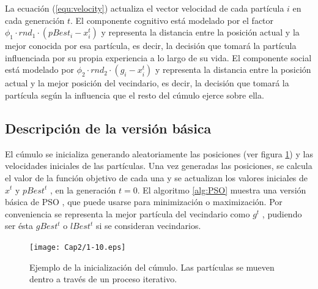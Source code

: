       La ecuaci\'on (\ref{equ:velocity}) actualiza el vector velocidad de cada part\'icula $i$ en cada generaci\'on $t$. El componente
      cognitivo est\'a modelado por el factor $\phi_1 \cdot rnd_1 \cdot \left(pBest_i - x^t_i \right)$ y representa la distancia entre la 
      posici\'on actual y la mejor conocida por esa part\'icula, es decir, la decisi\'on que tomar\'a la part\'icula influenciada por 
      su propia experiencia a lo largo de su vida. El componente social est\'a modelado por $\phi_2 \cdot rnd_2 \cdot \left(g_i - x^t_i \right)$ 
      y representa la distancia entre la posici\'on actual y la mejor posici\'on del vecindario, es decir, la decisi\'on que tomar\'a la 
      part\'icula seg\'un la influencia que el resto del c\'umulo ejerce sobre ella.     
    
    \subsection{Descripci\'on de la versi\'on b\'asica}
    
    El c\'umulo se inicializa generando aleatoriamente las posiciones (ver figura \ref{fig:iniciacion}) y las velocidades iniciales de las part\'iculas. Una vez generadas 
    las posiciones, se calcula el valor de la funci\'on objetivo de cada una y se actualizan los valores iniciales de $x^t$ y $pBest^t$ , en la 
    generaci\'on $t = 0$.  El algoritmo \ref{alg:PSO} muestra una versi\'on b\'asica de PSO \cite{JKennedySI}, que puede usarse para minimizaci\'on o 
    maximizaci\'on. Por conveniencia se representa la mejor part\'icula del vecindario como $g^t$ , pudiendo ser \'esta $gBest^t$ o 
    $lBest^t$ si se consideran vecindarios.

     \begin{figure}
	\centering
	\texttt{[image: Cap2/1-10.eps]}
	  \caption[Ejemplo de la inicializaci\'on del c\'umulo]{Ejemplo de la inicializaci\'on del c\'umulo. Las part\'iculas se mueven dentro 
	  a trav\'es de un proceso iterativo.}
      \label{fig:iniciacion}
      \end{figure}
    

